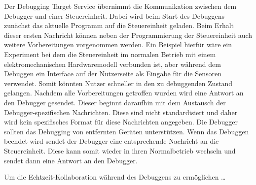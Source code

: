 Der Debugging Target Service übernimmt die Kommunikation zwischen dem Debugger und einer Steuereinheit. Dabei wird beim Start des Debuggens zunächst das aktuelle Programm auf die Steuereinheit geladen. Beim Erhalt dieser ersten Nachricht können neben der Programmierung der Steuereinheit auch weitere Vorbereitungen vorgenommen werden. Ein Beispiel hierfür wäre ein Experiment bei dem die Steuereinheit im normalen Betrieb mit einem elektromechanischen Hardwaremodell verbunden ist, aber während dem Debuggen ein Interface auf der Nutzerseite als Eingabe für die Sensoren verwendet. Somit könnten Nutzer schneller in den zu debuggenden Zustand gelangen. Nachdem alle Vorbereitungen getroffen wurden wird eine Antwort an den Debugger gesendet. Dieser beginnt daraufhin mit dem Austausch der Debugger-spezifischen Nachrichten. Diese sind nicht standardisiert und daher wird kein spezifisches Format für diese Nachrichten angegeben. Die Debugger sollten das Debugging von entfernten Geräten unterstützen. Wenn das Debuggen beendet wird sendet der Debugger eine entsprechende Nachricht an die Steuereinheit. Diese kann somit wieder in ihren Normalbetrieb wechseln und sendet dann eine Antwort an den Debugger.

Um die Echtzeit-Kollaboration während des Debuggens zu ermöglichen \dots